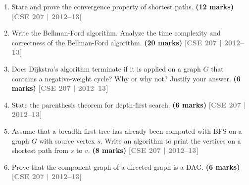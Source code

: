 \documentclass[12pt,a3paper]{article}
\newcommand{\yr}[1]{\hfill\textcolor{gray}{\small\textbf{[#1]}}}
\newcommand{\mk}[1]{\textcolor{orange!70!black}{\small\textbf{(#1 marks)}}}
\begin{document}
\begin{enumerate}
\item State and prove the convergence property of shortest paths. \mk{12}
\yr{CSE 207 | 2012--13}

\item Write the Bellman-Ford algorithm. Analyze the time complexity and correctness of the Bellman-Ford algorithm. \mk{20}
\yr{CSE 207 | 2012--13}

\item Does Dijkstra's algorithm terminate if it is applied on a graph $G$ that contains a negative-weight cycle? Why or why not? Justify your answer. \mk{6}
\yr{CSE 207 | 2012--13}

\item State the parenthesis theorem for depth-first search. \mk{6}
\yr{CSE 207 | 2012--13}

\item Assume that a breadth-first tree has already been computed with BFS on a graph $G$ with source vertex $s$. Write an algorithm to print the vertices on a shortest path from $s$ to $v$. \mk{8}
\yr{CSE 207 | 2012--13}

\item Prove that the component graph of a directed graph is a DAG. \mk{6}
\yr{CSE 207 | 2012--13}


\end{enumerate}
\end{document}

